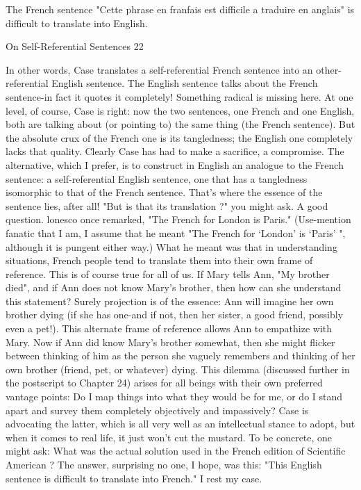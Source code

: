          The French sentence "Cette phrase en franfais est difficile a traduire en anglais"
is difficult to translate into English.




On Self-Referential Sentences                                                            22

In other words, Case translates a self-referential French sentence into an other- referential
English sentence. The English sentence talks about the French sentence-in fact it quotes it
completely! Something radical is missing here. At one level, of course, Case is right: now
the two sentences, one French and one English, both are talking about (or pointing to) the
same thing (the French sentence). But the absolute crux of the French one is its
tangledness; the English one completely lacks that quality. Clearly Case has had to make
a sacrifice, a compromise.
         The alternative, which I prefer, is to construct in English an analogue to the
French sentence: a self-referential English sentence, one that has a tangledness
isomorphic to that of the French sentence. That's where the essence of the sentence lies,
after all! "But is that its translation ?" you might ask. A good question.
         lonesco once remarked, "The French for London is Paris." (Use-mention fanatic
that I am, I assume that he meant "The French for `London' is `Paris' ", although it is
pungent either way.) What he meant was that in understanding situations, French people
tend to translate them into their own frame of reference. This is of course true for all of
us. If Mary tells Ann, "My brother died", and if Ann does not know Mary's brother, then
how can she understand this statement? Surely projection is of the essence: Ann will
imagine her own brother dying (if she has one-and if not, then her sister, a good friend,
possibly even a pet!). This alternate frame of reference allows Ann to empathize with
Mary. Now if Ann did know Mary's brother somewhat, then she might flicker between
thinking of him as the person she vaguely remembers and thinking of her own brother
(friend, pet, or whatever) dying. This dilemma (discussed further in the postscript to
Chapter 24) arises for all beings with their own preferred vantage points: Do I map things
into what they would be for me, or do I stand apart and survey them completely
objectively and impassively?
         Case is advocating the latter, which is all very well as an intellectual stance to
adopt, but when it comes to real life, it just won't cut the mustard. To be concrete, one
might ask: What was the actual solution used in the French edition of Scientific American
? The answer, surprising no one, I hope, was this: "This English sentence is difficult to
translate into French." I rest my case.

